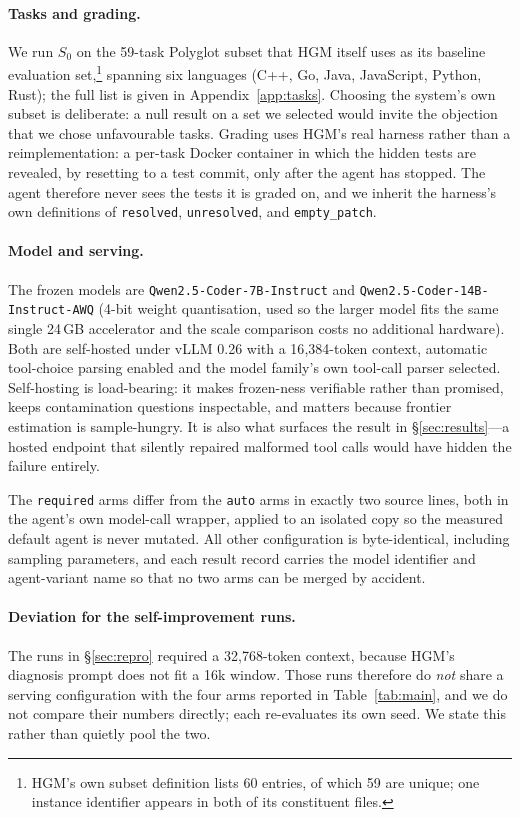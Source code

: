 \documentclass{article}
\newcommand{\Sz}{\ensuremath{S_0}}
\begin{document}
\paragraph{Tasks and grading.}
We run \Sz{} on the 59-task Polyglot subset that HGM itself uses as its
baseline evaluation set,\footnote{HGM's own subset definition lists 60 entries,
of which 59 are unique; one instance identifier appears in both of its
constituent files.} spanning six languages (C++, Go, Java, JavaScript, Python,
Rust); the full list is given in Appendix~\ref{app:tasks}. Choosing the
system's own subset is deliberate: a null result on a set we selected would
invite the objection that we chose unfavourable tasks.
Grading uses HGM's real harness rather than a reimplementation: a per-task
Docker container in which the hidden tests are revealed, by resetting to a
test commit, only after the agent has stopped. The agent therefore never sees
the tests it is graded on, and we inherit the harness's own definitions of
\texttt{resolved}, \texttt{unresolved}, and \texttt{empty\_patch}.

\paragraph{Model and serving.}
The frozen models are \texttt{Qwen2.5-Coder-7B-Instruct} and
\texttt{Qwen2.5-Coder-14B-Instruct-AWQ} (4-bit weight quantisation, used so
the larger model fits the same single 24\,GB accelerator and the scale
comparison costs no additional hardware). Both are self-hosted under vLLM
0.26 with a 16{,}384-token context, automatic tool-choice parsing enabled and
the model family's own tool-call parser selected. Self-hosting is
load-bearing: it makes frozen-ness verifiable rather than promised, keeps
contamination questions inspectable, and matters because frontier estimation
is sample-hungry. It is also what surfaces the result in
\S\ref{sec:results}---a hosted endpoint that silently repaired malformed tool
calls would have hidden the failure entirely.

The \texttt{required} arms differ from the \texttt{auto} arms in exactly two
source lines, both in the agent's own model-call wrapper, applied to an
isolated copy so the measured default agent is never mutated. All other
configuration is byte-identical, including sampling parameters, and each
result record carries the model identifier and agent-variant name so that no
two arms can be merged by accident.

\paragraph{Deviation for the self-improvement runs.}
The runs in \S\ref{sec:repro} required a 32{,}768-token context, because
HGM's diagnosis prompt does not fit a 16k window. Those runs therefore do
\emph{not} share a serving configuration with the four arms reported in
Table~\ref{tab:main}, and we do not compare their numbers directly; each
re-evaluates its own seed. We state this rather than quietly pool the two.
\end{document}
